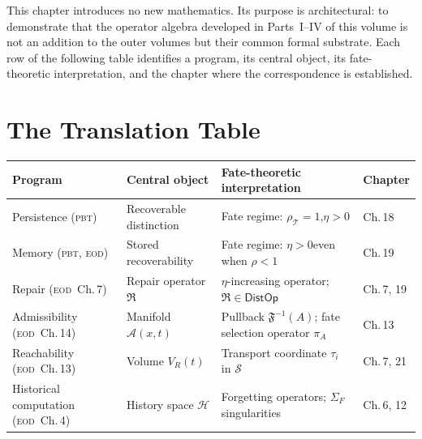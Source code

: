 \documentclass[12pt,twoside,openright]{book}
\newcommand{\hist}{\mathcal{H}}
\newcommand{\adm}{\mathcal{A}}            %
\newcommand{\repair}{\mathfrak{R}}        %
\newcommand{\transfam}{\mathcal{T}}       %
\newcommand{\fateMap}{\mathfrak{F}}
\newcommand{\fateSpace}{\mathcal{S}}
\newcommand{\survRatio}{\rho}             %
\newcommand{\repEff}{\eta}               %
\newcommand{\distOp}{\mathsf{DistOp}}
\newcommand{\strataF}{\Sigma_{F}}   %
\newcommand{\admRegion}{A}
\newcommand{\admOp}{\pi_{\!\admRegion}}
\providecommand{\strataF}{\Sigma_{F}}
\providecommand{\admRegion}{A}
\providecommand{\admOp}{\pi_{\!\admRegion}}
\begin{document}
This chapter introduces no new mathematics. Its purpose is
architectural: to demonstrate that the operator algebra
developed in Parts~I--IV of this volume is not an addition to
the outer volumes but their common formal substrate. Each row
of the following table identifies a program, its central
object, its fate-theoretic interpretation, and the chapter
where the correspondence is established.

\section{The Translation Table}

\begin{longtable}{@{}p{2.8cm}p{2.4cm}p{3.5cm}p{1.8cm}@{}}
\toprule
\textbf{Program} & \textbf{Central object} &
  \textbf{Fate-theoretic interpretation} & \textbf{Chapter} \\
\midrule
\endhead
Persistence \newline (\textsc{pbt}) &
  Recoverable distinction &
  Fate regime: $\survRatio_\transfam=1$,\newline $\repEff>0$ &
  Ch.\,18 \\[6pt]
Memory \newline (\textsc{pbt}, \textsc{eod}) &
  Stored recoverability &
  Fate regime: $\repEff>0$\newline even when $\survRatio<1$ &
  Ch.\,19 \\[6pt]
Repair \newline (\textsc{eod}~Ch.\,7) &
  Repair operator $\repair$ &
  $\repEff$-increasing operator;\newline
  $\repair\in\distOp$ &
  Ch.\,7, 19 \\[6pt]
Admissibility \newline (\textsc{eod}~Ch.\,14) &
  Manifold $\adm(x,t)$ &
  Pullback $\fateMap^{-1}(\admRegion)$;\newline
  fate selection operator $\admOp$ &
  Ch.\,13 \\[6pt]
Reachability \newline (\textsc{eod}~Ch.\,13) &
  Volume $V_R(t)$ &
  Transport coordinate\newline
  $\tau_i$ in $\fateSpace$ &
  Ch.\,7, 21 \\[6pt]
Historical \newline computation \newline (\textsc{eod}~Ch.\,4) &
  History space $\hist$ &
  Forgetting operators;\newline
  $\strataF$ singularities &
  Ch.\,6, 12 \\[6pt]

\end{longtable}
\end{document}

